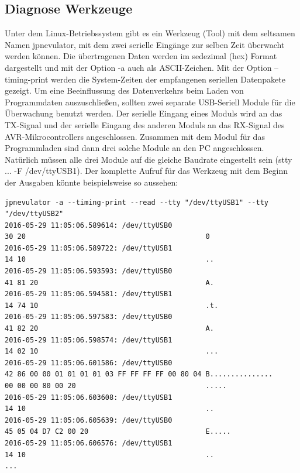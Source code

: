 \subsection{Diagnose Werkzeuge}
Unter dem Linux-Betriebssystem gibt es ein Werkzeug (Tool) mit dem seltsamen Namen jpnevulator, mit dem
zwei serielle Eingänge zur selben Zeit überwacht werden können.
Die übertragenen Daten werden im sedezimal (hex) Format dargestellt und mit der Option -a auch als ASCII-Zeichen.
Mit der Option --timing-print werden die System-Zeiten der empfangenen seriellen Datenpakete gezeigt.
Um eine Beeinflussung des Datenverkehrs beim Laden von Programmdaten auszuschließen, sollten
zwei separate USB-Seriell Module für die Überwachung benutzt werden.
Der serielle Eingang eines Moduls wird an das TX-Signal und der serielle Eingang des anderen Moduls
an das RX-Signal des AVR-Mikrocontrollers angeschlossen.
Zusammen mit dem Modul für das Programmladen sind dann drei solche Module an den PC angeschlossen.
Natürlich müssen alle drei Module auf die gleiche Baudrate eingestellt sein (stty ... -F /dev/ttyUSB1).
Der komplette Aufruf für das Werkzeug mit dem Beginn der Ausgaben könnte beispielsweise so aussehen:
\begin{verbatim}
jpnevulator -a --timing-print --read --tty "/dev/ttyUSB1" --tty "/dev/ttyUSB2"
2016-05-29 11:05:06.589614: /dev/ttyUSB0
30 20                                           0
2016-05-29 11:05:06.589722: /dev/ttyUSB1
14 10                                           ..
2016-05-29 11:05:06.593593: /dev/ttyUSB0
41 81 20                                        A.
2016-05-29 11:05:06.594581: /dev/ttyUSB1
14 74 10                                        .t.
2016-05-29 11:05:06.597583: /dev/ttyUSB0
41 82 20                                        A.
2016-05-29 11:05:06.598574: /dev/ttyUSB1
14 02 10                                        ...
2016-05-29 11:05:06.601586: /dev/ttyUSB0
42 86 00 00 01 01 01 01 03 FF FF FF FF 00 80 04 B...............
00 00 00 80 00 20                               .....
2016-05-29 11:05:06.603608: /dev/ttyUSB1
14 10                                           ..
2016-05-29 11:05:06.605639: /dev/ttyUSB0
45 05 04 D7 C2 00 20                            E.....
2016-05-29 11:05:06.606576: /dev/ttyUSB1
14 10                                           ..
...
\end{verbatim}
